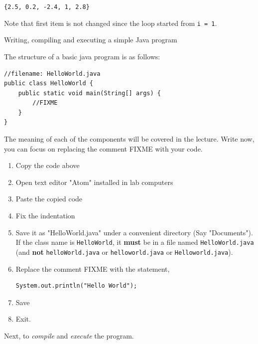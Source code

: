 \begin{questions}
\begin{solution}
\texttt{\{2.5, 0.2, -2.4, 1, 2.8\}}

Note that first item is not changed since the loop started from \texttt{i = 1}.	
\end{solution}

\newpage

\question Writing, compiling and executing a simple Java program 

The structure of a basic java program is as follows:

\begin{lstlisting}[numbers=none]
//filename: HelloWorld.java
public class HelloWorld {
	public static void main(String[] args) {
		//FIXME
	}
}
\end{lstlisting}

The meaning of each of the components will be covered in the lecture. Write now, you can focus on replacing the comment FIXME with your code. 

\begin{enumerate}
	\item Copy the code above
	\item Open text editor "Atom" installed in lab computers
	\item Paste the copied code
	\item Fix the indentation
	\item Save it as "HelloWorld.java" under a convenient directory (Say "Documents"). If the class name is \texttt{HelloWorld}, it \textbf{must} be in a file named \texttt{HelloWorld.java} (and \textbf{not} \texttt{helloWorld.java} or \texttt{helloworld.java} or \texttt{Helloworld.java}).
	\item Replace the comment FIXME with the statement,
		\begin{lstlisting}
System.out.println("Hello World");
		\end{lstlisting}
	\item Save
	\item Exit.
\end{enumerate}

Next, to \emph{compile} and \emph{execute} the program. 


\end{questions}
